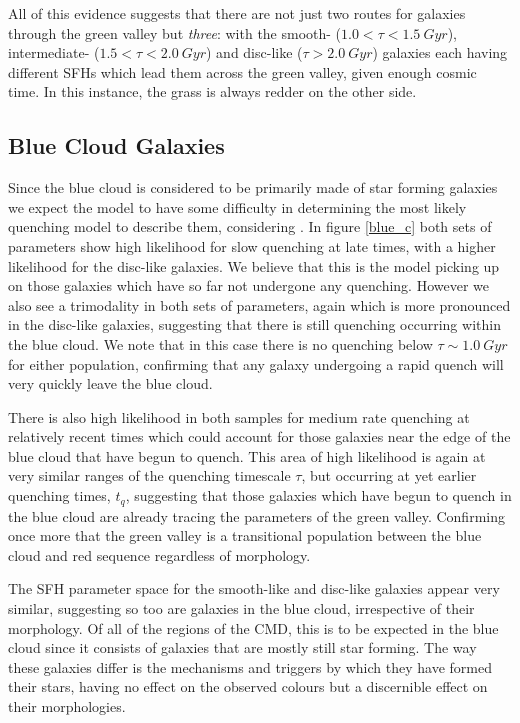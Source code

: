 \documentclass{mn2e}
\begin{document}
All of this evidence suggests that there are not just two routes for galaxies through the green valley but \emph{three}: with the smooth- ($1.0 < \tau < 1.5 ~Gyr$), intermediate- ($1.5 < \tau < 2.0~Gyr$) and disc-like ($\tau > 2.0~Gyr$) galaxies each having different SFHs which lead them across the green valley, given enough cosmic time. In this instance, the grass is always redder on the other side.


\subsection{Blue Cloud Galaxies}
Since the blue cloud is considered to be primarily made of star forming galaxies we expect the model to have some difficulty in determining the most likely quenching model to describe them, considering . In figure \ref{blue_c} both sets of parameters show high likelihood for slow quenching at late times, with a higher likelihood for the disc-like galaxies. We believe that this is the model picking up on those galaxies which have so far not undergone any quenching. However we also see a trimodality in both sets of parameters, again which is more pronounced in the disc-like galaxies, suggesting that there is still quenching occurring within the blue cloud. We note that in this case there is no quenching below $\tau \sim 1.0~Gyr$ for either population, confirming that any galaxy undergoing a rapid quench will very quickly leave the blue cloud. 

There is also high likelihood in both samples for medium rate quenching at relatively recent times which could account for those galaxies near the edge of the blue cloud that have begun to quench. This area of high likelihood is again at very similar ranges of the quenching timescale $\tau$, but occurring at yet earlier quenching times, $t_q$, suggesting that those galaxies which have begun to quench in the blue cloud are already tracing the parameters of the green valley. Confirming once more that the green valley is a transitional population between the blue cloud and red sequence regardless of morphology.

The SFH parameter space for the smooth-like and disc-like galaxies appear very similar, suggesting so too are galaxies in the blue cloud, irrespective of their morphology. Of all of the regions of the CMD, this is to be expected in the blue cloud since it consists of galaxies that are mostly still star forming. The way these galaxies differ is the mechanisms and triggers by which they have formed their stars, having no effect on the observed colours but a discernible effect on their morphologies.
\end{document}

